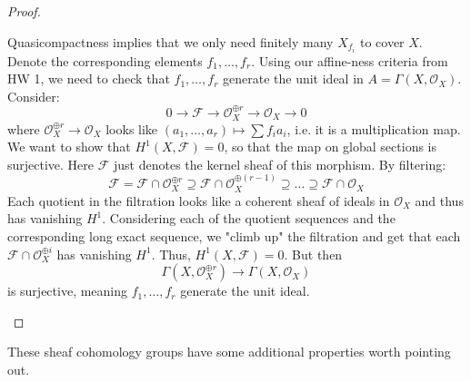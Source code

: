 \documentclass[10pt,reqno]{amsart}
\theoremstyle{definition}
\newtheorem{remark}[theorem]{Remark}
\theoremstyle{remark}
\numberwithin{equation}{section}
\numberwithin{theorem}{section}
\newcommand{\OO}{{\mathcal O}}
\newcommand{\FF}{{\mathscr F}}
\begin{document}
\begin{proof}
\begin{itemize}
Quasicompactness implies that we only need finitely many $X_{f_i}$ to cover $X$. Denote the corresponding elements $f_1,\dots,f_r$. Using our affine-ness criteria from HW 1, we need to check that $f_1,\dots,f_r$ generate the unit ideal in $A = \Gamma(X,\OO_X)$. Consider:
\[0 \to \FF \to \OO^{\oplus r}_X \to \OO_X \to 0\]
where $\OO^{\oplus r}_X \to \OO_X$ looks like $(a_1,\dots,a_r) \mapsto \sum f_i a_i$, i.e. it is a multiplication map. We want to show that $H^1(X,\FF) = 0$, so that the map on global sections is surjective. Here $\FF$ just denotes the kernel sheaf of this morphism. By filtering:
\[\FF = \FF \cap \OO_X^{\oplus r} \supseteq \FF \cap \OO_X^{\oplus (r-1)} \supseteq \dots \supseteq \FF \cap \OO_X \]
Each quotient in the filtration looks like a coherent sheaf of ideals in $\OO_X$ and thus has vanishing $H^1$. Considering each of the quotient sequences and the corresponding long exact sequence, we "climb up" the filtration and get that each $\FF \cap \OO_X^{\oplus i}$ has vanishing $H^1$. Thus, $H^1(X,\FF) = 0$. But then 
\[\Gamma(X,\OO^{\oplus r}_X) \to \Gamma(X,\OO_X)\]
is surjective, meaning $f_1,\dots,f_r$ generate the unit ideal.
\end{itemize}
\end{proof}

These sheaf cohomology groups have some additional properties worth pointing out.
\end{document}
